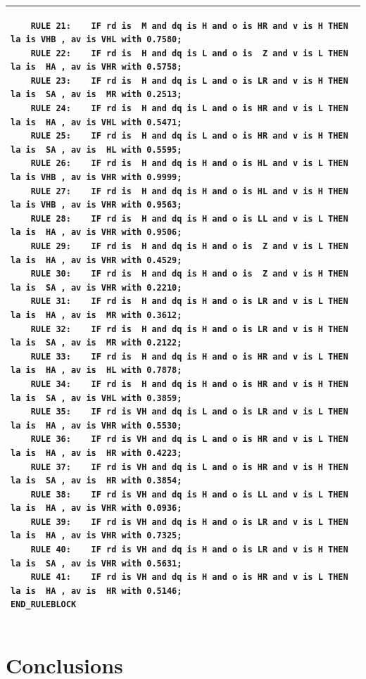 \documentclass[conference]{IEEEtran}
\begin{document}
\begin{table}[!t]
\begin{tabular}{|l|}
\begin{lstlisting}
    RULE 21:    IF rd is  M and dq is H and o is HR and v is H THEN la is VHB , av is VHL with 0.7580;
    RULE 22:    IF rd is  H and dq is L and o is  Z and v is L THEN la is  HA , av is VHR with 0.5758;
    RULE 23:    IF rd is  H and dq is L and o is LR and v is H THEN la is  SA , av is  MR with 0.2513;
    RULE 24:    IF rd is  H and dq is L and o is HR and v is L THEN la is  HA , av is VHL with 0.5471;
    RULE 25:    IF rd is  H and dq is L and o is HR and v is H THEN la is  SA , av is  HL with 0.5595;
    RULE 26:    IF rd is  H and dq is H and o is HL and v is L THEN la is VHB , av is VHR with 0.9999;
    RULE 27:    IF rd is  H and dq is H and o is HL and v is H THEN la is VHB , av is VHR with 0.9563;
    RULE 28:    IF rd is  H and dq is H and o is LL and v is L THEN la is  HA , av is VHR with 0.9506;
    RULE 29:    IF rd is  H and dq is H and o is  Z and v is L THEN la is  HA , av is VHR with 0.4529;
    RULE 30:    IF rd is  H and dq is H and o is  Z and v is H THEN la is  SA , av is VHR with 0.2210;
    RULE 31:    IF rd is  H and dq is H and o is LR and v is L THEN la is  HA , av is  MR with 0.3612;
    RULE 32:    IF rd is  H and dq is H and o is LR and v is H THEN la is  SA , av is  MR with 0.2122;
    RULE 33:    IF rd is  H and dq is H and o is HR and v is L THEN la is  HA , av is  HL with 0.7878;
    RULE 34:    IF rd is  H and dq is H and o is HR and v is H THEN la is  SA , av is VHL with 0.3859;
    RULE 35:    IF rd is VH and dq is L and o is LR and v is L THEN la is  HA , av is VHR with 0.5530;
    RULE 36:    IF rd is VH and dq is L and o is HR and v is L THEN la is  HA , av is  HR with 0.4223;
    RULE 37:    IF rd is VH and dq is L and o is HR and v is H THEN la is  SA , av is  HR with 0.3854;
    RULE 38:    IF rd is VH and dq is H and o is LL and v is L THEN la is  HA , av is VHR with 0.0936;
    RULE 39:    IF rd is VH and dq is H and o is LR and v is L THEN la is  HA , av is VHR with 0.7325;
    RULE 40:    IF rd is VH and dq is H and o is LR and v is H THEN la is  SA , av is VHR with 0.5631;
    RULE 41:    IF rd is VH and dq is H and o is HR and v is L THEN la is  HA , av is  HR with 0.5146;
END_RULEBLOCK
\end{lstlisting} \\
\hline
\end{tabular}
\end{table}

\section{Conclusions}
\label{sec:con}
\end{document}
